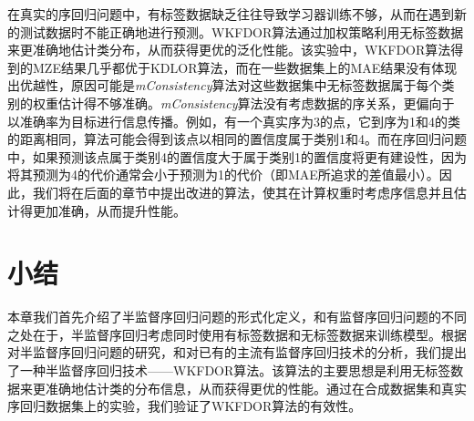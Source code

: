 在真实的序回归问题中，有标签数据缺乏往往导致学习器训练不够，从而在遇到新的测试数据时不能正确地进行预测。WKFDOR算法通过加权策略利用无标签数据来更准确地估计类分布，从而获得更优的泛化性能。该实验中，WKFDOR算法得到的MZE结果几乎都优于KDLOR算法，而在一些数据集上的MAE结果没有体现出优越性，原因可能是\textit{mConsistency}算法对这些数据集中无标签数据属于每个类别的权重估计得不够准确。\textit{mConsistency}算法没有考虑数据的序关系，更偏向于以准确率为目标进行信息传播。例如，有一个真实序为3的点，它到序为1和4的类的距离相同，算法可能会得到该点以相同的置信度属于类别1和4。而在序回归问题中，如果预测该点属于类别4的置信度大于属于类别1的置信度将更有建设性，因为将其预测为4的代价通常会小于预测为1的代价（即MAE所追求的差值最小）。因此，我们将在后面的章节中提出改进的算法，使其在计算权重时考虑序信息并且估计得更加准确，从而提升性能。

\section{小结}
本章我们首先介绍了半监督序回归问题的形式化定义，和有监督序回归问题的不同之处在于，半监督序回归考虑同时使用有标签数据和无标签数据来训练模型。根据对半监督序回归问题的研究，和对已有的主流有监督序回归技术的分析，我们提出了一种半监督序回归技术——WKFDOR算法。该算法的主要思想是利用无标签数据来更准确地估计类的分布信息，从而获得更优的性能。通过在合成数据集和真实序回归数据集上的实验，我们验证了WKFDOR算法的有效性。








